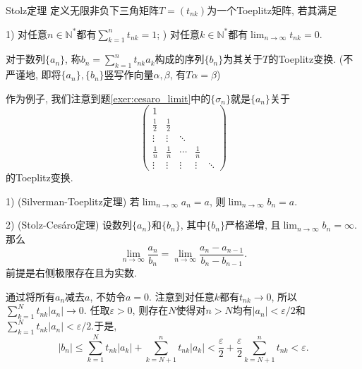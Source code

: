 \begin{exercise}{Stolz定理}
	定义无限非负下三角矩阵$T=(t_{nk})$为一个Toeplitz矩阵, 若其满足

	1) 对任意$n \in \mathbb{N}^{*}$都有$\sum_{k=1}^{n} t_{nk}=1$; ) 对任意$k \in \mathbb{N}^{*}$都有$\lim_{n\to \infty} t_{nk}=0$.

	对于数列$\{ a_n \}$, 称$b_n=\sum_{k=1}^{n} t_{nk}a_k$构成的序列$\{ b_n \}$为其关于$T$的Toeplitz变换. (不严谨地, 即将$\{ a_n \},\{ b_n \}$竖写作向量$\alpha ,\beta$, 有$T\alpha = \beta$)

	作为例子, 我们注意到题\ref{exer:cesaro_limit}中的$\{ \sigma _n \}$就是$\{ a_n \}$关于$$\begin{pmatrix}
 1 &  &  &  & \\
 \frac{1}{2}  & \frac{1}{2} &  &  & \\
 \vdots & \vdots & \ddots &  & \\
 \frac{1}{n}  & \frac{1}{n} & \cdots & \frac{1}{n} & \\
 \vdots & \vdots & \vdots & \vdots & \ddots
\end{pmatrix}$$的Toeplitz变换. 

	1) (Silverman-Toeplitz定理) 若$\lim_{n\to \infty} a_n=a$, 则$\lim_{n\to \infty} b_n=a$. 
	
	2) (Stolz-Cesáro定理) 设数列$\{ a_n \}$和$\{ b_n \}$, 其中$\{ b_n \}$严格递增, 且$\lim_{n\to \infty} b_n = \infty$. 那么$$\lim_{n\to \infty} \frac{a_n}{b_n} = \lim_{n\to \infty} \frac{a_n-a_{n-1}}{b_n-b_{n-1}}. $$
前提是右侧极限存在且为实数. 
\end{exercise}
\begin{solution}
	通过将所有$a_n$减去$a$, 不妨令$a=0$. 注意到对任意$k$都有$t_{nk} \to 0$, 所以$\sum_{k=1}^{N} t_{nk}|a_n| \to 0$. 任取$\varepsilon >0$, 则存在$N$使得对$n>N$均有$|a_n|<\varepsilon /2$和$\sum_{k=1}^{N} t_{nk}|a_n| < \varepsilon /2$.于是, 
	$$|b_n| \leq \sum_{k=1}^{N} t_{nk} |a_k| + \sum_{k=N+1}^{n}t_{nk}|a_k| < \frac{\varepsilon}{2} + \frac{\varepsilon}{2}\sum_{k=N+1}^{n}t_{nk} < \varepsilon .$$
\end{solution}
